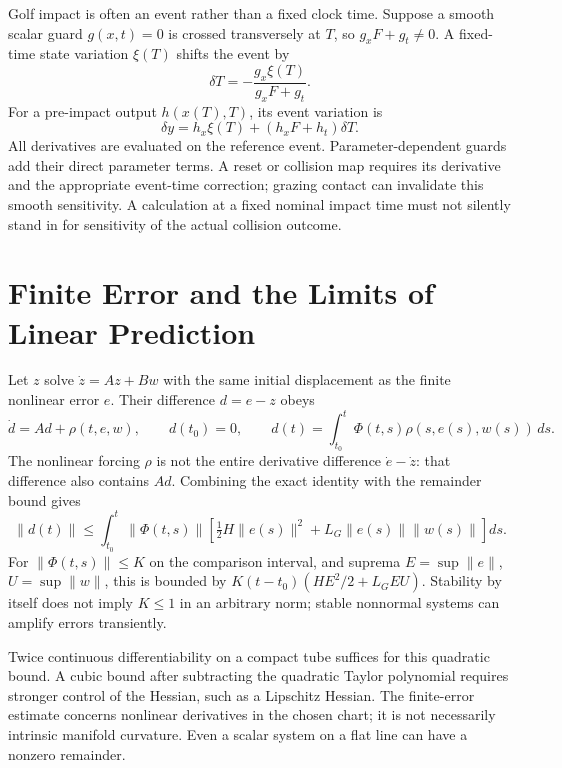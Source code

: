 Golf impact is often an event rather than a fixed clock time. Suppose a smooth scalar guard $g(x,t)=0$ is crossed transversely at $T$, so $g_xF+g_t\ne0$. A fixed-time state variation $\xi(T)$ shifts the event by
\begin{equation}
\delta T=-\frac{g_x\xi(T)}{g_xF+g_t}.
\end{equation}
For a pre-impact output $h(x(T),T)$, its event variation is
\begin{equation}
\delta y=h_x\xi(T)+(h_xF+h_t)\delta T.
\end{equation}
All derivatives are evaluated on the reference event. Parameter-dependent guards add their direct parameter terms. A reset or collision map requires its derivative and the appropriate event-time correction; grazing contact can invalidate this smooth sensitivity. A calculation at a fixed nominal impact time must not silently stand in for sensitivity of the actual collision outcome.

\section{Finite Error and the Limits of Linear Prediction}

Let $z$ solve $\dot z=Az+Bw$ with the same initial displacement as the finite nonlinear error $e$. Their difference $d=e-z$ obeys
\begin{equation}
\dot d=Ad+\rho(t,e,w),\qquad d(t_0)=0,
\qquad d(t)=\int_{t_0}^t\Phi(t,s)\rho(s,e(s),w(s))\,ds.
\label{eq:ch2:residual-integral}
\end{equation}
The nonlinear forcing $\rho$ is not the entire derivative difference $\dot e-\dot z$: that difference also contains $Ad$. Combining the exact identity with the remainder bound gives
\begin{equation}
\|d(t)\|\le\int_{t_0}^t\|\Phi(t,s)\|
\left[\tfrac12H\|e(s)\|^2+L_G\|e(s)\|\|w(s)\|\right]ds.
\end{equation}
For $\|\Phi(t,s)\|\le K$ on the comparison interval, and suprema $E=\sup\|e\|$, $U=\sup\|w\|$, this is bounded by $K(t-t_0)(HE^2/2+L_GEU)$. Stability by itself does not imply $K\le1$ in an arbitrary norm; stable nonnormal systems can amplify errors transiently.

Twice continuous differentiability on a compact tube suffices for this quadratic bound. A cubic bound after subtracting the quadratic Taylor polynomial requires stronger control of the Hessian, such as a Lipschitz Hessian. The finite-error estimate concerns nonlinear derivatives in the chosen chart; it is not necessarily intrinsic manifold curvature. Even a scalar system on a flat line can have a nonzero remainder.

